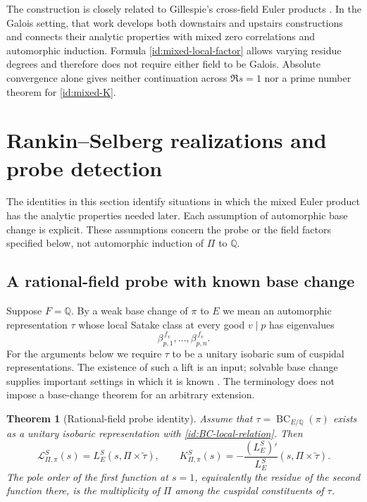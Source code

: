 \documentclass[11pt,reqno]{amsart}
\numberwithin{equation}{section}
\newtheorem{theorem}{Theorem}[section]
\theoremstyle{definition}
\theoremstyle{remark}
\newcommand{\Q}{\mathbb Q}
\begin{document}
The construction is closely related to Gillespie's cross-field Euler
products \cite{Gillespie2014}. In the Galois setting, that work develops
both downstairs and upstairs constructions and connects their analytic
properties with mixed zero correlations and automorphic induction.
Formula \eqref{id:mixed-local-factor} allows varying residue degrees and
therefore does not require either field to be Galois. Absolute convergence
alone gives neither continuation across $\Re s=1$ nor a prime number
theorem for \eqref{id:mixed-K}.

\section{Rankin--Selberg realizations and probe detection}\label{id:sec-realizations}\label{id:section}

The identities in this section identify situations in which the mixed
Euler product has the analytic properties needed later. Each assumption
of automorphic base change is explicit. These assumptions concern the
probe or the field factors specified below, not automorphic induction of
$\Pi$ to $\Q$.

\subsection{A rational-field probe with known base change}
Suppose $F=\Q$. By a weak base change of $\pi$ to $E$ we mean an automorphic
representation $\tau$ whose local Satake class at every good $v\mid p$
has eigenvalues
\begin{equation}\label{id:BC-local-relation}
 \beta_{p,1}^{\,f_v},\ldots,\beta_{p,n}^{\,f_v}.
\end{equation}
For the arguments below we require $\tau$ to be a unitary isobaric sum of
cuspidal representations. The existence of such a lift is an input;
solvable base change supplies important settings in which it is known
\cite{AC}. The terminology does not impose a base-change theorem for an
arbitrary extension.

\begin{theorem}[Rational-field probe identity]\label{id:Q-probe}
Assume that $\tau=\operatorname{BC}_{E/\Q}(\pi)$ exists as a unitary isobaric
representation with \eqref{id:BC-local-relation}. Then
\begin{equation}\label{id:Q-probe-identity}
 \mathscr L_{\Pi,\pi}^S(s)=L_E^S(s,\Pi\times\widetilde\tau),\qquad
 K_{\Pi,\pi}^S(s)=-\frac{(L_E^S)'}{L_E^S}(s,\Pi\times\widetilde\tau).
\end{equation}
The pole order of the first function at $s=1$, equivalently the residue
of the second function there, is the multiplicity of $\Pi$ among the
cuspidal constituents of $\tau$.
\end{theorem}
\end{document}
